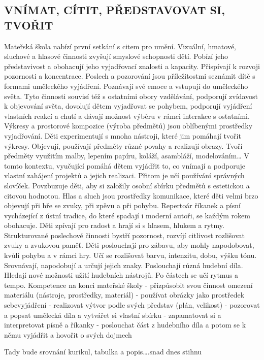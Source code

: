 	\subsection{VNÍMAT, CÍTIT, PŘEDSTAVOVAT SI, TVOŘIT}
		Mateřská škola nabízí první setkání s citem pro umění. Vizuální, hmatové, sluchové a hlasové činnosti zvyšují smyslové schopnosti dětí. Pobízí jeho představivost a obohacují jeho vyjadřovací znalosti a kapacity. Přispívají k rozvoji pozornosti a koncentrace. Poslech a pozorování jsou příležitostmi seznámit dítě s formami uměleckého vyjádření. Poznávají své emoce a vstupují do uměleckého světa.
		Tyto činnosti souvisí též s ostatními obory vzdělávání, podporují zvídavost k objevování světa, dovolují dětem vyjadřovat se pohybem, podporují vyjádření vlastních reakcí a chutí a dávají možnost výběru v rámci interakce s ostatními.
		Výkresy a prostorové kompozice (výroba předmětů) jsou oblíbenými prostředky vyjadřování.
		Děti experimentují s mnoha nástroji, které jim pomáhají tvořit výkresy. Objevují, používají předměty různé povahy a realizují obrazy. Tvoří předměty využitím malby, lepením papíru, koláží, asambláží, modelováním…
		V tomto kontextu, vyučující pomáhá dětem vyjádřit to, co vnímají a podporuje vlastní zahájení projektů a jejich realizaci. Přitom je učí používání správných slovíček. Povzbuzuje děti, aby si založily osobní sbírku předmětů s estetickou a citovou hodnotou.
		Hlas a sluch jsou prostředky komunikace, které děti velmi brzo objevují při hře se zvuky, při zpěvu a při pohybu.
		Repertoár říkanek a písní vycházející z ústní tradice, do které spadají i moderní autoři, se každým rokem obohacuje. Děti zpívají pro radost a hrají si s hlasem, hlukem a rytmy.
		Strukturované poslechové činnosti bystří pozornost, rozvíjí citlivost rozlišovat zvuky a zvukovou paměť. Děti poslouchají pro zábavu, aby mohly napodobovat, kvůli pohybu a v rámci hry. Učí se rozlišovat barvu, intenzitu, dobu, výšku tónu. Srovnávají, napodobují a určují jejich znaky. Poslouchají různá hudební díla. Hledají nové možnosti užití hudebních nástrojů. Po částech se učí rytmus a tempo. 
		Kompetence na konci mateřské školy
		- přizpůsobit svou činnost omezení materiálu (nástroje, prostředky, materiál)
		- používat obrázky jako prostředek sebevyjádření
		- realizovat výtvor podle svých představ (plán, velikost)
		- pozorovat a popsat umělecká díla a vytvářet si vlastní sbírku
		- zapamatovat si a interpretovat písně a říkanky
		- poslouchat část z hudebního díla a potom se k němu vyjádřit a hovořit o svých dojmech


	Tady bude srovnání kurikul, tabulka a popis….snad dnes stihnu






